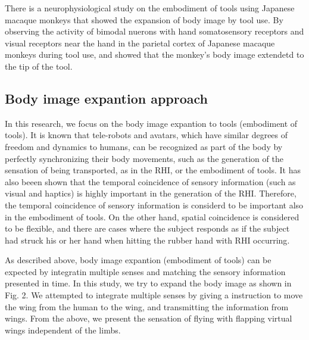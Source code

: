 \documentclass[letterpaper, 10 pt, conference]{ieeeconf}  %
\begin{document}
                There is a neurophysiological study on the embodiment of tools using Japanese macaque monkeys that showed the expansion of body image by tool use.  
                By observing the activity of bimodal nuerons with hand somatosensory receptors and visual receptors near the hand in the parietal cortex of Japanese macaque monkeys during tool use, and showed that the monkey's body image extendetd to the tip of the tool\cite{iriki1996coding}.
                
        \subsection{Body image expantion approach}
                In this research, we focus on the body image expantion to tools (embodiment of tools).
                It is known that tele-robots and avatars, which have similar degrees of freedom and dynamics to humans, can be recognized as part of the body by perfectly synchronizing their body movements, such as the generation of the sensation of being transported, as in the RHI, or the embodiment of tools.
                It has also beeen shown that the temporal coincidence of sensory information (such as visual and haptics) is highly important in the generation of the RHI\cite{ehrsson2007experimental}.  
                Therefore, the temporal coincidence of sensory information is considerd to be important also in the embodiment of tools.  
                On the other hand, spatial coincidence is considered to be flexible, and there are cases where the subject responds as if the subject had struck his or her hand when hitting the rubber hand with RHI occurring\cite{armel2003projecting}.  


                As described above, body image expantion (embodiment of tools) can be expected by integratin multiple senses and matching the sensory information presented in time.  
                In this study, we try to expand the body image as shown in Fig. 2.  
                We attempted to integrate multiple senses by giving a instruction to move the wing from the human to the wing, and transmitting 
                the information from wings.
                From the above, we present the sensation of flying with flapping virtual wings independent of the limbs.
\end{document}
